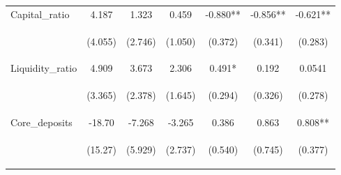 \documentclass[]{article}
\begin{document}
\begin{center}
\begin{tabular}{lcccccc}
Capital\_ratio & 4.187 & 1.323 & 0.459 & -0.880** & -0.856** & -0.621** \\
\vspace{4pt} & \begin{footnotesize}(4.055)\end{footnotesize} & \begin{footnotesize}(2.746)\end{footnotesize} & \begin{footnotesize}(1.050)\end{footnotesize} & \begin{footnotesize}(0.372)\end{footnotesize} & \begin{footnotesize}(0.341)\end{footnotesize} & \begin{footnotesize}(0.283)\end{footnotesize} \\
Liquidity\_ratio & 4.909 & 3.673 & 2.306 & 0.491* & 0.192 & 0.0541 \\
\vspace{4pt} & \begin{footnotesize}(3.365)\end{footnotesize} & \begin{footnotesize}(2.378)\end{footnotesize} & \begin{footnotesize}(1.645)\end{footnotesize} & \begin{footnotesize}(0.294)\end{footnotesize} & \begin{footnotesize}(0.326)\end{footnotesize} & \begin{footnotesize}(0.278)\end{footnotesize} \\
Core\_deposits & -18.70 & -7.268 & -3.265 & 0.386 & 0.863 & 0.808** \\
\vspace{4pt} & \begin{footnotesize}(15.27)\end{footnotesize} & \begin{footnotesize}(5.929)\end{footnotesize} & \begin{footnotesize}(2.737)\end{footnotesize} & \begin{footnotesize}(0.540)\end{footnotesize} & \begin{footnotesize}(0.745)\end{footnotesize} & \begin{footnotesize}(0.377)\end{footnotesize} \\

\end{tabular}
\end{center}
\end{document}
